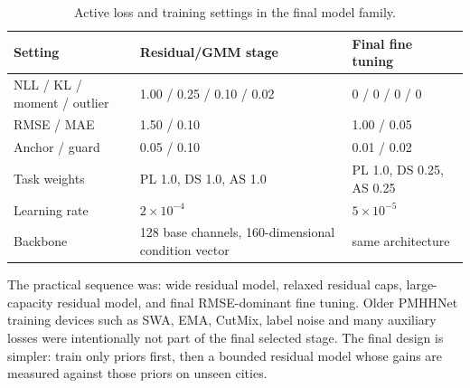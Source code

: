\begin{table}[htbp]
\centering
\caption{Active loss and training settings in the final model family.}
\label{tab:try80_loss_settings}
\scriptsize
\begin{tabularx}{\textwidth}{lXX}
\toprule
Setting & Residual/GMM stage & Final fine tuning \\
\midrule
NLL / KL / moment / outlier & 1.00 / 0.25 / 0.10 / 0.02 & 0 / 0 / 0 / 0 \\
RMSE / MAE & 1.50 / 0.10 & 1.00 / 0.05 \\
Anchor / guard & 0.05 / 0.10 & 0.01 / 0.02 \\
Task weights & PL 1.0, DS 1.0, AS 1.0 & PL 1.0, DS 0.25, AS 0.25 \\
Learning rate & \(2\times10^{-4}\) & \(5\times10^{-5}\) \\
Backbone & 128 base channels, 160-dimensional condition vector & same architecture \\
\bottomrule
\end{tabularx}
\end{table}

The practical sequence was: wide residual model, relaxed residual caps,
large-capacity residual model, and final RMSE-dominant fine tuning. Older
PMHHNet training devices such as SWA, EMA, CutMix, label noise and many
auxiliary losses were intentionally not part of the final selected stage. The
final design is simpler: train only priors first, then a bounded residual model
whose gains are measured against those priors on unseen cities.
